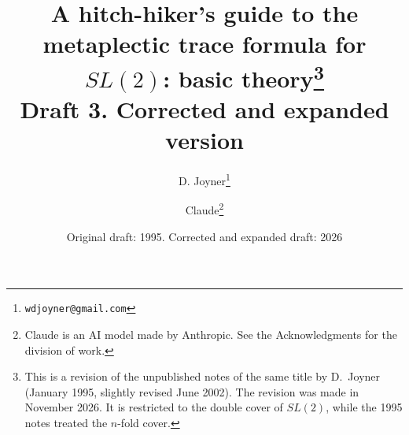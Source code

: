 \documentclass[12pt,letterpaper,openany]{book}
\numberwithin{equation}{chapter}
\theoremstyle{plain}
\theoremstyle{definition}
\theoremstyle{remark}
\theoremstyle{plain}
\begin{document}
\title{A hitch-hiker's guide to the metaplectic trace formula for $SL(2)$:
basic theory\thanks{This is a revision of the unpublished notes of the
same title by D.~Joyner (January 1995, slightly revised June 2002). The
revision was made in November 2026. It is restricted to the double cover
of $SL(2)$, while the 1995 notes treated the $n$-fold cover.}\\[6pt]
\large Draft 3. Corrected and expanded version}
\author{D. Joyner\thanks{\texttt{wdjoyner@gmail.com}} \and
Claude\thanks{Claude is an AI model made by Anthropic. See the
Acknowledgments for the division of work.}}
\date{Original draft: 1995. Corrected and expanded draft: 2026}
\maketitle
\end{document}
